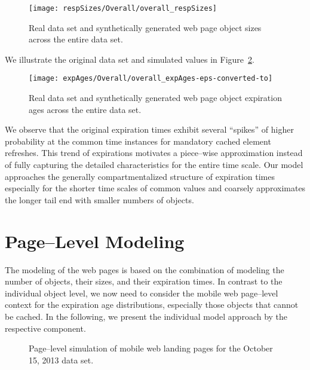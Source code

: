\begin{figure}[b!]
	\centering
	\texttt{[image: respSizes/Overall/overall\_respSizes]}
	\caption{Real data set and synthetically generated web page object sizes across the entire data set.}
	\label{fig:osize}
\end{figure}

We illustrate the original data set and simulated values in Figure~\ref{fig:oexp}.
\begin{figure}[b]
	\centering
	\texttt{[image: expAges/Overall/overall\_expAges-eps-converted-to]}
	\caption{Real data set and synthetically generated web page object expiration ages across the entire data set.}
	\label{fig:oexp}
\end{figure}
We observe that the original expiration times exhibit several ``spikes'' of higher probability at the common time instances for mandatory cached element refreshes. 
This trend of expirations motivates a piece--wise approximation instead of fully capturing the detailed characteristics for the entire time scale.
Our model approaches the generally compartmentalized structure of expiration times especially for the shorter time scales of common values and coarsely approximates the longer tail end with smaller numbers of objects.


\section{Page--Level Modeling}
\label{s:page}
The modeling of the web pages is based on the combination of modeling the number of objects, their sizes, and their expiration times.
In contrast to the individual object level, we now need to consider the mobile web page--level context for the expiration age distributions, especially those objects that cannot be cached.
In the following, we present the individual model approach by the respective component.

\begin{figure}[t!]
	\centering
	\qquad
	\vspace{.1in}
	\qquad
	\vspace{.1in}
	\qquad	
	\vspace{.1in}
	\caption{Page--level simulation of mobile web landing pages for the October 15, 2013 data set.\label{fig:pages}}
\end{figure}

